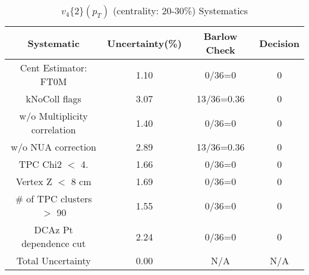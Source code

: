 \begin{table}[htbp]
\caption{$v_4\{2\}(p_{T})$ (centrality: 20-30\%) Systematics}
\label{tab:Sys_pTDiffv4}
\centering
\begin{tabular}{|c|c|c|c|}
\hline
Systematic & Uncertainty(\%) & Barlow Check & Decision \\
\hline
Cent Estimator: FT0M & 1.10 & 0/36=0 & 0 \\
kNoColl flags & 3.07 & 13/36=0.36 & 0 \\
w/o Multiplicity correlation & 1.40 & 0/36=0 & 0 \\
w/o NUA correction & 2.89 & 13/36=0.36 & 0 \\
TPC Chi2 $<$ 4. & 1.66 & 0/36=0 & 0 \\
Vertex Z $<$ 8 cm & 1.69 & 0/36=0 & 0 \\
\# of TPC clusters $>$ 90 & 1.55 & 0/36=0 & 0 \\
DCAz Pt dependence cut & 2.24 & 0/36=0 & 0 \\
\hline
Total Uncertainty & 0.00 & N/A & N/A \\
\hline
\end{tabular}
\end{table}
